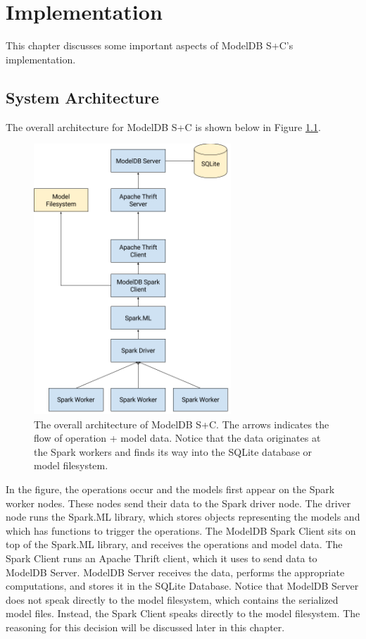 \chapter{Implementation}
This chapter discusses some important aspects of ModelDB S+C's implementation.

\section{System Architecture}
The overall architecture for ModelDB S+C is shown below in Figure 
\ref{fig:system_architecture}.

\begin{figure}
  \centering
  \includegraphics[height=4.0in]{system_architecture}
  \caption{
    The overall architecture of ModelDB S+C. The arrows indicates the flow
    of operation + model data. Notice that the data originates at the Spark workers and
    finds its way into the SQLite database or model filesystem.
  }
  \label{fig:system_architecture}
\end{figure}

In the figure, the operations occur and the models first appear on the Spark worker nodes.
These nodes send their data to the Spark driver node. The driver node runs the Spark.ML
library, which stores objects representing the models and which has functions to trigger
the operations. The ModelDB Spark Client sits on top of the Spark.ML library, and receives the
operations and model data. The Spark Client runs an Apache Thrift client, which it uses to
send data to ModelDB Server. ModelDB Server receives the data, performs the appropriate computations,
and stores it in the SQLite Database. Notice that ModelDB Server does not speak directly to the
model filesystem, which contains the serialized model files. Instead, the Spark Client speaks directly
to the model filesystem. The reasoning for this decision will be discussed later in this chapter.

